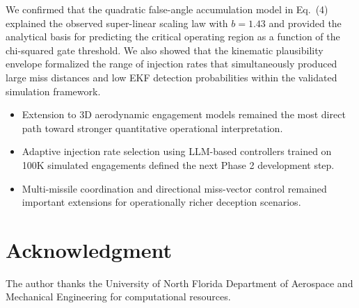 \documentclass[journal]{IEEEtran}
\begin{document}
We confirmed that the quadratic false-angle accumulation model in
Eq.~(4) explained the observed super-linear scaling law with
$b = 1.43$ and provided the analytical basis for predicting the
critical operating region as a function of the chi-squared gate
threshold.  We also showed that the kinematic plausibility envelope
formalized the range of injection rates that simultaneously produced
large miss distances and low EKF detection probabilities within the
validated simulation framework.

\begin{itemize}
\item Extension to 3D aerodynamic engagement models remained the most direct path toward stronger quantitative operational interpretation.
\item Adaptive injection rate selection using LLM-based controllers trained on 100K simulated engagements defined the next Phase 2 development step.
\item Multi-missile coordination and directional miss-vector control remained important extensions for operationally richer deception scenarios.
\end{itemize}

\section*{Acknowledgment}
The author thanks the University of North Florida Department of
Aerospace and Mechanical Engineering for computational resources.
\end{document}
